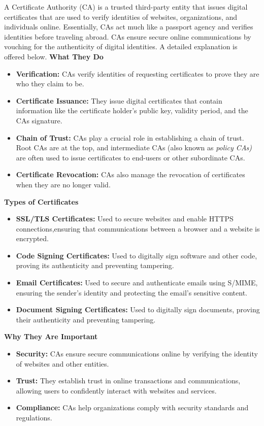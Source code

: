  A Certificate Authority (CA) is a trusted third-party entity that issues digital certificates that are used to verify identities of websites, organizations, and individuals online. Essentially, CAs act much like a passport agency and verifies identities before traveling abroad. CAs ensure secure online communications by vouching for the authenticity of digital identities. A detailed explanation is offered below.
\textbf{What They Do}
\begin{itemize}
    \item \textbf{Verification:} CAs verify identities of requesting certificates to prove they are who they claim to be.
    \item \textbf{Certificate Issuance:} They issue digital certificates that contain information like the certificate holder's public key, validity period, and the CAs signature.
    \item \textbf{Chain of Trust:} CAs play a crucial role in establishing a chain of trust. Root CAs are at the top, and intermediate CAs (also known as \textit{policy CAs)} are often used to issue certificates to end-users or other subordinate CAs.
    \item \textbf{Certificate Revocation:} CAs also manage the revocation of certificates when they are no longer valid.
 \end{itemize}
\textbf{Types of Certificates}
\begin{itemize}
    \item \textbf{SSL/TLS Certificates:} Used to secure websites and enable HTTPS connections,ensuring that communications between a browser and a website is encrypted.
    \item \textbf{Code Signing Certificates:} Used to digitally sign software and other code, proving its authenticity and preventing tampering.
    \item \textbf{Email Certificates:} Used to secure and authenticate emails using S/MIME, ensuring the sender's identity and protecting the email's sensitive content.
    \item \textbf{Document Signing Certificates:} Used to digitally sign documents, proving their authenticity and preventing tampering.
\end{itemize}
\textbf{Why They Are Important}
\begin{itemize}
\item \textbf{Security:} CAs ensure secure communications online by verifying the identity of websites and other entities.
\item \textbf{Trust:} They establish trust in online transactions and communications, allowing users to confidently interact with websites and services.
\item \textbf{Compliance:} CAs help organizations comply with security standards and regulations.
\end{itemize}
